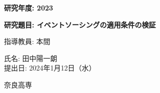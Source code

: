 \documentclass[../../main]{subfiles}
\begin{document}
    \begin{titlepage}
        \centering
        \vspace*{1cm}

        \Large
        \textbf{研究年度: 2023}

        \vspace{1.5cm}
        \huge
        \textbf{研究題目: イベントソーシングの適用条件の検証}

        \vspace{1.5cm}
        \Large
        指導教員: 本間

        \vfill

        \Large
        氏名: 田中陽一朗 \\
        提出日: 2024年1月12日（水）

        \vspace{1.5cm}
        \large
        奈良高専

        \vspace{1cm}
    \end{titlepage}
\end{document}
